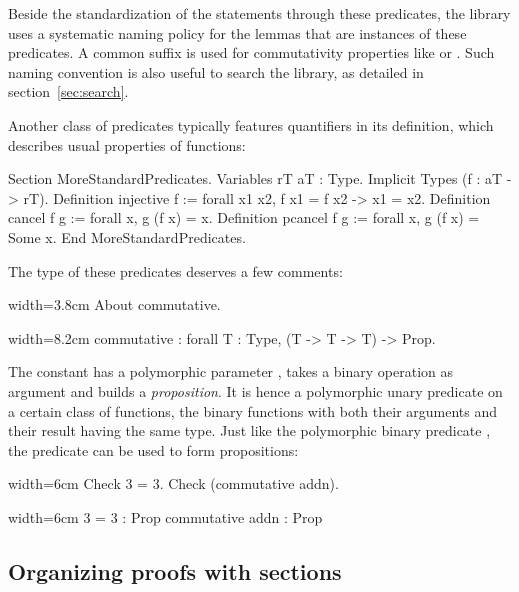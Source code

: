 Beside the standardization of the statements through these
predicates, the \mcbMC{} library uses a systematic naming policy for the lemmas
that are instances of these predicates. A common suffix  is
used for commutativity properties like  or .
Such naming convention is also useful to search the library, as detailed
in section~\ref{sec:search}.

Another class of predicates typically features quantifiers in its
definition, which describes usual properties of functions:

\begin{coq}{}{}
Section MoreStandardPredicates.
Variables rT aT : Type.
Implicit Types (f : aT -> rT).
Definition injective f := forall x1 x2, f x1 = f x2 -> x1 = x2.
Definition cancel f g := forall x, g (f x) = x.
Definition pcancel f g := forall x, g (f x) = Some x.
End MoreStandardPredicates.
\end{coq}
The type of these predicates deserves a few comments:

\begin{coq}{}{width=3.8cm}
About commutative.
\end{coq}
\begin{coqout}{}{width=8.2cm}
commutative : forall T : Type, (T -> T -> T) -> Prop.
\end{coqout}
The constant  has a polymorphic parameter ,
takes a binary operation as argument and builds a
\emph{proposition}. It is hence a polymorphic unary predicate on
a certain class of functions, the binary functions with both their
arguments and their result having the same type. Just like the
polymorphic binary predicate , the predicate  can
be used to form propositions:

\begin{coq}{}{width=6cm}
Check 3 = 3.
Check (commutative addn).
\end{coq}
\begin{coqout}{}{width=6cm}
3 = 3 : Prop
commutative addn : Prop
\end{coqout}


\subsection{Organizing proofs with sections}

